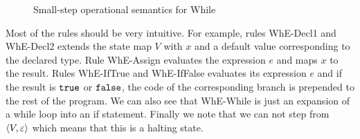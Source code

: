 \begin{figure}[h]
  \centering
  
  \RuleSpace

  
  \RuleSpace


  \RuleSpace


  \RuleSpace

  { \: \rightarrow \: }

  \RuleSpace 

  { \: \rightarrow \: }
  
  \RuleSpace


  \caption{Small-step operational semantics for While}
  \label{fig:while_sos}
\end{figure}

Most of the rules should be very intuitive. For example, rules {\sc WhE-Decl1} and {\sc
WhE-Decl2} extends the state map $V$ with $x$ and a default value corresponding
to the declared type. Rule {\sc WhE-Assign} evaluates the expression $e$ and
maps $x$ to the result. Rules {\sc WhE-IfTrue} and {\sc WhE-IfFalse} evaluates
its expression $e$ and if the result is $\mbox{\texttt{true}}$ or $\mbox{\texttt{false}}$, the code of the
corresponding branch is prepended to the rest of the program. We can also see
that {\sc WhE-While} is just an expansion of a while loop into an if statement.
Finally we note that we can not step from $\langle V, \varepsilon \rangle$ which means
that this is a halting state.

